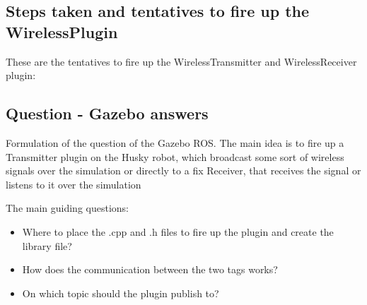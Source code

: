 \documentclass[11pt,a4paper]{article}
\begin{document}
\subsection{Steps taken and tentatives to fire up the WirelessPlugin}

These are the tentatives to fire up the WirelessTransmitter and WirelessReceiver plugin: 



\subsection{Question - Gazebo answers}

Formulation of the question of the Gazebo ROS.
The main idea is to fire up a Transmitter plugin on the Husky robot, which broadcast some sort of wireless signals over the simulation or directly to a fix Receiver, that receives the signal or listens to it over the simulation

The main guiding questions:
\begin{itemize}
\item Where to place the .cpp and .h files to fire up the plugin and create the library file?
\item How does the communication between the two tags works? 
\item On which topic should the plugin publish to?
\end{itemize}
\end{document}
